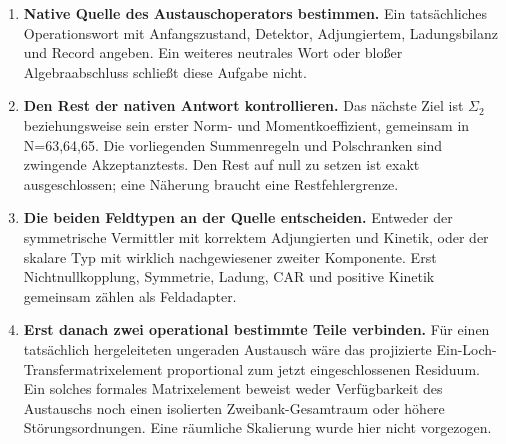 \begin{enumerate}
\def\labelenumi{\arabic{enumi}.}
\tightlist
\item
  \textbf{Native Quelle des Austauschoperators bestimmen.} Ein
  tatsächliches Operationswort mit Anfangszustand, Detektor,
  Adjungiertem, Ladungsbilanz und Record angeben. Ein weiteres neutrales
  Wort oder bloßer Algebraabschluss schließt diese Aufgabe nicht.
\item
  \textbf{Den Rest der nativen Antwort kontrollieren.} Das nächste Ziel
  ist \(\Sigma_2\) beziehungsweise sein erster Norm- und
  Momentkoeffizient, gemeinsam in N=63,64,65. Die vorliegenden
  Summenregeln und Polschranken sind zwingende Akzeptanztests. Den Rest
  auf null zu setzen ist exakt ausgeschlossen; eine Näherung braucht
  eine Restfehlergrenze.
\item
  \textbf{Die beiden Feldtypen an der Quelle entscheiden.} Entweder der
  symmetrische Vermittler mit korrektem Adjungierten und Kinetik, oder
  der skalare Typ mit wirklich nachgewiesener zweiter Komponente. Erst
  Nichtnullkopplung, Symmetrie, Ladung, CAR und positive Kinetik
  gemeinsam zählen als Feldadapter.
\item
  \textbf{Erst danach zwei operational bestimmte Teile verbinden.} Für
  einen tatsächlich hergeleiteten ungeraden Austausch wäre das
  projizierte Ein-Loch-Transfermatrixelement proportional zum jetzt
  eingeschlossenen Residuum. Ein solches formales Matrixelement beweist
  weder Verfügbarkeit des Austauschs noch einen isolierten
  Zweibank-Gesamtraum oder höhere Störungsordnungen. Eine räumliche
  Skalierung wurde hier nicht vorgezogen.
\end{enumerate}

